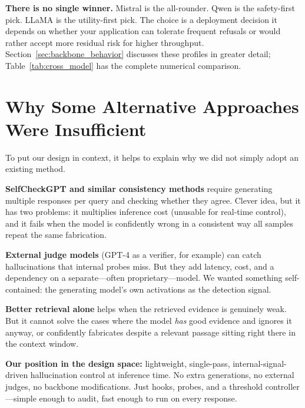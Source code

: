 \textbf{There is no single winner.} Mistral is the all-rounder. Qwen is the safety-first pick. LLaMA is the utility-first pick. The choice is a deployment decision it depends on whether your application can tolerate frequent refusals or would rather accept more residual risk for higher throughput. Section~\ref{sec:backbone_behavior} discusses these profiles in greater detail; Table~\ref{tab:cross_model} has the complete numerical comparison.

\section{Why Some Alternative Approaches Were Insufficient}
\label{sec:alternative_methods}

To put our design in context, it helps to explain why we did not simply adopt an existing method.

\textbf{SelfCheckGPT and similar consistency methods} require generating multiple responses per query and checking whether they agree. Clever idea, but it has two problems: it multiplies inference cost (unusable for real-time control), and it fails when the model is confidently wrong in a consistent way all samples repeat the same fabrication.

\textbf{External judge models} (GPT-4 as a verifier, for example) can catch hallucinations that internal probes miss. But they add latency, cost, and a dependency on a separate—often proprietary—model. We wanted something self-contained: the generating model's own activations as the detection signal.

\textbf{Better retrieval alone} helps when the retrieved evidence is genuinely weak. But it cannot solve the cases where the model \emph{has} good evidence and ignores it anyway, or confidently fabricates despite a relevant passage sitting right there in the context window.

\textbf{Our position in the design space:} lightweight, single-pass, internal-signal-driven hallucination control at inference time. No extra generations, no external judges, no backbone modifications. Just hooks, probes, and a threshold controller—simple enough to audit, fast enough to run on every response.
